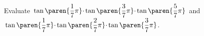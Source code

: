 Evaluate
$\mspace{2mu}
 \tan\paren{\dfrac{1}{7} \pi} \mspace{-3.5mu} \cdot \mspace{-1.5mu}
 \tan\paren{\dfrac{3}{7} \pi} \mspace{-3.5mu} \cdot \mspace{-1.5mu}
 \tan\paren{\dfrac{5}{7} \pi} \mspace{2mu}$
and
$\mspace{2mu}
 \tan\paren{\dfrac{1}{7} \pi} \mspace{-3.5mu} \cdot \mspace{-1.5mu}
 \tan\paren{\dfrac{2}{7} \pi} \mspace{-3.5mu} \cdot \mspace{-1.5mu}
 \tan\paren{\dfrac{3}{7} \pi}$.
